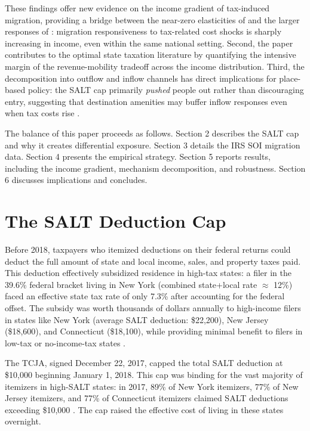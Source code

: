 \documentclass[12pt]{article}
\begin{document}
These findings offer new evidence on the income gradient of tax-induced migration, providing a bridge between the near-zero elasticities of \citet{young2011} and the larger responses of \citet{kleven2013}: migration responsiveness to tax-related cost shocks is sharply increasing in income, even within the same national setting. Second, the paper contributes to the optimal state taxation literature \citep{gordon1986,epple1991,haughwout2004} by quantifying the intensive margin of the revenue-mobility tradeoff across the income distribution. Third, the decomposition into outflow and inflow channels has direct implications for place-based policy: the SALT cap primarily \textit{pushed} people out rather than discouraging entry, suggesting that destination amenities may buffer inflow responses even when tax costs rise \citep{diamond2016}.

The balance of this paper proceeds as follows. Section 2 describes the SALT cap and why it creates differential exposure. Section 3 details the IRS SOI migration data. Section 4 presents the empirical strategy. Section 5 reports results, including the income gradient, mechanism decomposition, and robustness. Section 6 discusses implications and concludes.


\section{The SALT Deduction Cap}

Before 2018, taxpayers who itemized deductions on their federal returns could deduct the full amount of state and local income, sales, and property taxes paid. This deduction effectively subsidized residence in high-tax states: a filer in the 39.6\% federal bracket living in New York (combined state+local rate $\approx$ 12\%) faced an effective state tax rate of only 7.3\% after accounting for the federal offset. The subsidy was worth thousands of dollars annually to high-income filers in states like New York (average SALT deduction: \$22,200), New Jersey (\$18,600), and Connecticut (\$18,100), while providing minimal benefit to filers in low-tax or no-income-tax states \citep{sammartino2018}.

The TCJA, signed December 22, 2017, capped the total SALT deduction at \$10,000 beginning January 1, 2018. This cap was binding for the vast majority of itemizers in high-SALT states: in 2017, 89\% of New York itemizers, 77\% of New Jersey itemizers, and 77\% of Connecticut itemizers claimed SALT deductions exceeding \$10,000 \citep{taxfoundation2018}. The cap raised the effective cost of living in these states overnight.
\end{document}
